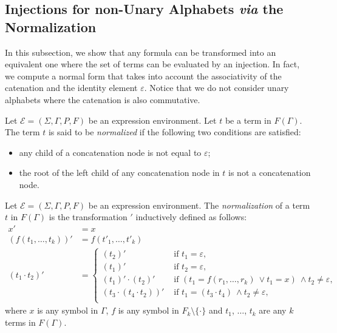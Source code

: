 \documentclass[a4paper]{llncs}
\begin{document}
  
  \subsection{Injections for non-Unary Alphabets \emph{via} the Normalization}\label{ssec normalization alph non unaire}
  
  In this subsection, we show that any formula can be transformed into an equivalent one where the set of terms can be evaluated by an injection. In fact, we compute a normal form that takes into account the associativity of the catenation and the identity element $\varepsilon$. Notice that we do not consider unary alphabets where the catenation is also commutative.
  
  \begin{definition}
    Let $\mathcal{E}=(\Sigma,\Gamma,P,F)$ be an expression environment. Let $t$ be a term in $F(\Gamma)$. The term $t$ is said to be \emph{normalized} if the  following two conditions are satisfied:
    \begin{itemize}
      \item any child of a concatenation node is not equal to $\varepsilon$;
      \item the root of the left child of any concatenation node in $t$ is not a concatenation node. 
    \end{itemize}
  \end{definition}   
  
  \begin{definition}[Normalization]
    Let $\mathcal{E}=(\Sigma,\Gamma,P,F)$ be an expression environment. The \emph{normalization} of a term $t$ in $F(\Gamma)$ is the transformation $'$ inductively defined as follows:
        \begin{align*}
          x'&=x\\
          (f(t_1,\ldots,t_k))'&=f(t'_1,\ldots,t'_k)\\
          (t_1\cdot t_2)'&=
        \begin{cases}
            (t_2)' & \text{ if } t_1=\varepsilon,\\
            (t_1)' & \text{ if } t_2=\varepsilon,\\
            (t_1)'\cdot(t_2)' & \text{ if } (t_1=f(r_1,\ldots,r_k)\ \vee t_1=x)\ \wedge t_2\neq\varepsilon,\\
            (t_3\cdot(t_4\cdot t_2))' & \text{ if } t_1=(t_3\cdot t_4)\ \wedge t_2\neq\varepsilon,\\
          \end{cases}
        \end{align*}
        where $x$ is any symbol in $\Gamma$, $f$ is any symbol in $F_k\setminus\{\cdot\}$ and $t_1$, $\ldots$, $t_k$ are any $k$ terms in $F(\Gamma)$.   
  \end{definition}
  
\end{document}
